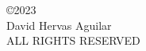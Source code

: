 
\begin{center}
\begin{singlespace}
\copyright 2023\\
David Hervas Aguilar\\
ALL RIGHTS RESERVED
\end{singlespace}
\end{center}

\clearpage
